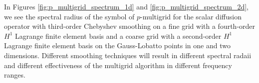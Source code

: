 In Figures \ref{fig:p_multigrid_spectrum_1d} and \ref{fig:p_multigrid_spectrum_2d}, we see the spectral radius of the symbol of $p$-multigrid for the scalar diffusion operator with third-order Chebyshev smoothing on a fine grid with a fourth-order $H^1$ Lagrange finite element basis and a coarse grid with a second-order $H^1$ Lagrange finite element basis on the Gauss-Lobatto points in one and two dimensions.
Different smoothing techniques will result in different spectral radaii and different effectiveness of the multigrid algorithm in different frequency ranges.
